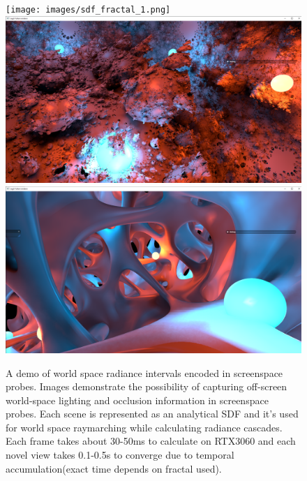 \documentclass{jcgt}
\begin{document}
\begin{figure}[htb]
  \texttt{[image: images/sdf\_fractal\_1.png]}
  \includegraphics[width=0.49\columnwidth]{images/sdf_fractal_2.png}
  \includegraphics[width=0.49\columnwidth]{images/sdf_goopy2.png}
  \caption{\label{fig:sdf_world_space}
     A demo of world space radiance intervals encoded in screenspace probes. Images demonstrate the possibility of capturing off-screen world-space lighting and occlusion information in screenspace probes. Each scene is represented as an analytical SDF and it's used for world space raymarching while calculating radiance cascades. Each frame takes about 30-50ms to calculate on RTX3060 and each novel view takes 0.1-0.5s to converge due to temporal accumulation(exact time depends on fractal used).}
\end{figure}
\end{document}
